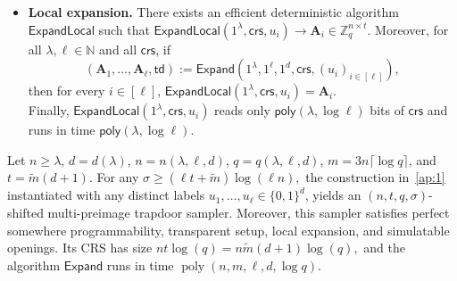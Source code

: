 \begin{itemize}
\begin{itemize}
\item The statistical distance between
$
    \left\{
        \mathsf{crs}\leftarrow \mathsf{Gen}(1^\lambda,1^\ell)
    \right\}
$
and
\[
    \left\{
        \widetilde{\mathsf{crs}}
        \ \middle|\
        \mathbf A_i\leftarrow \mathbb Z_q^{n\times t},\;
        \widetilde{\mathsf{crs}}
        :=
        \mathsf{GenProg}
        (1^\lambda,1^\ell,1^d,u_i,\mathbf A_i)
    \right\}
\]
is $\mathsf{negl}(\lambda)$.
\end{itemize}
\item\textbf{Local expansion.}
There exists an efficient deterministic algorithm $\mathsf{ExpandLocal}$ such
that
$
    \mathsf{ExpandLocal}(1^\lambda,\mathsf{crs},u_i)
    \to \mathbf A_i\in\mathbb Z_q^{n\times t}.
$
Moreover, for all $\lambda,\ell\in\mathbb N$ and all $\mathsf{crs}$, if
\[
    (\mathbf A_1,\ldots,\mathbf A_\ell,\mathsf{td})
    :=
    \mathsf{Expand}
    (1^\lambda,1^\ell,1^d,\mathsf{crs},(u_i)_{i\in[\ell]}),
\]
then for every $i\in[\ell]$,
$
    \mathsf{ExpandLocal}(1^\lambda,\mathsf{crs},u_i)
    =
    \mathbf A_i .
$\\
Finally, $\mathsf{ExpandLocal}(1^\lambda,\mathsf{crs},u_i)$ reads only
$\mathsf{poly}(\lambda,\log \ell)$ bits of $\mathsf{crs}$ and runs in time
$\mathsf{poly}(\lambda,\log \ell)$.

\end{itemize}
\begin{lemma}
\label{lem:smps}
Let $n \geq \lambda$, $d=d(\lambda)$, $n=n(\lambda,\ell,d)$,
$q=q(\lambda,\ell,d)$, $m=3n\lceil \log q\rceil$, and
$t=\widetilde{m}(d+1)$. For any
$
    \sigma \geq (\ell t+\widetilde{m})\log(\ell n),
$
the construction in~\ref{ap:1} instantiated with any distinct labels
$u_1,\ldots,u_\ell \in \{0,1\}^d$, yields an
$(n,t,q,\sigma)$-shifted multi-preimage trapdoor sampler.
Moreover, this sampler satisfies perfect somewhere programmability,
transparent setup, local expansion, and simulatable openings. Its CRS
has size
$
    nt\log(q)=n\widetilde{m}(d+1)\log(q),
$
and the algorithm $\mathsf{Expand}$ runs in time
$\operatorname{poly}(n,m,\ell,d,\log q)$.
\end{lemma}


